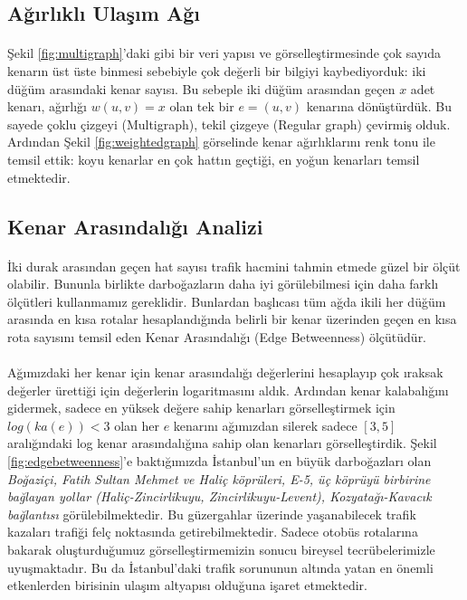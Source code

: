 \documentclass[10pt,a4paper,twocolumn]{article}
\begin{document}
\subsection{Ağırlıklı Ulaşım Ağı}
\paragraph{} Şekil \ref{fig:multigraph}'daki gibi bir veri yapısı ve görselleştirmesinde çok sayıda kenarın üst üste binmesi sebebiyle çok değerli bir bilgiyi kaybediyorduk: iki düğüm arasındaki kenar sayısı. Bu sebeple iki düğüm arasından geçen $x$ adet kenarı, ağırlığı $w(u,v) = x$ olan tek bir $e=(u,v)$ kenarına dönüştürdük. Bu sayede çoklu çizgeyi (Multigraph), tekil çizgeye (Regular graph) çevirmiş olduk. Ardından Şekil \ref{fig:weightedgraph} görselinde kenar ağırlıklarını renk tonu ile temsil ettik: koyu kenarlar en çok hattın geçtiği, en yoğun kenarları temsil etmektedir.

\subsection{Kenar Arasındalığı Analizi}
\paragraph{} İki durak arasından geçen hat sayısı trafik hacmini tahmin etmede güzel bir ölçüt olabilir. Bununla birlikte darboğazların daha iyi görülebilmesi için daha farklı ölçütleri kullanmamız gereklidir. Bunlardan başlıcası tüm ağda ikili her düğüm arasında en kısa rotalar hesaplandığında belirli bir kenar üzerinden geçen en kısa rota sayısını temsil eden Kenar Arasındalığı (Edge Betweenness) ölçütüdür.

\paragraph{} Ağımızdaki her kenar için kenar arasındalığı değerlerini hesaplayıp çok ıraksak değerler ürettiği için değerlerin logaritmasını aldık. Ardından kenar kalabalığını gidermek, sadece en yüksek değere sahip kenarları görselleştirmek için $log(ka(e)) < 3$ olan her $e$ kenarını ağımızdan silerek sadece $[3,5]$ aralığındaki log kenar arasındalığına sahip olan kenarları görselleştirdik. Şekil \ref{fig:edgebetweenness}'e baktığımızda İstanbul'un en büyük darboğazları olan \textit{Boğaziçi, Fatih Sultan Mehmet ve Haliç köprüleri, E-5, üç köprüyü birbirine bağlayan yollar (Haliç-Zincirlikuyu, Zincirlikuyu-Levent), Kozyatağı-Kavacık bağlantısı} görülebilmektedir. Bu güzergahlar üzerinde yaşanabilecek trafik kazaları trafiği felç noktasında getirebilmektedir. Sadece otobüs rotalarına bakarak oluşturduğumuz görselleştirmemizin sonucu bireysel tecrübelerimizle uyuşmaktadır. Bu da İstanbul'daki trafik sorununun altında yatan en önemli etkenlerden birisinin ulaşım altyapısı olduğuna işaret etmektedir.
\end{document}
